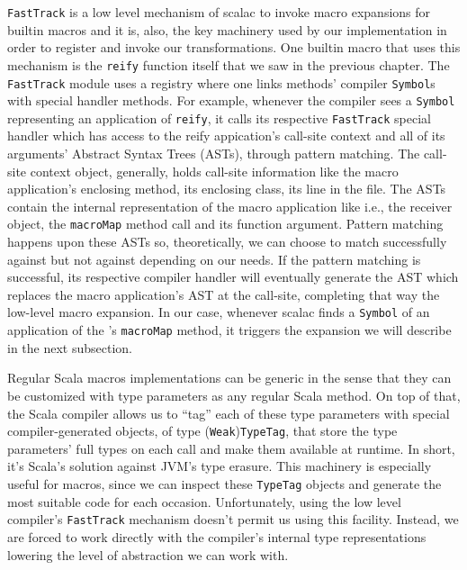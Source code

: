 \texttt{FastTrack} is a low level mechanism of scalac to invoke macro
expansions for builtin macros and it is, also, the key machinery used by our
implementation in order to register and invoke our transformations. One builtin
macro that uses this mechanism is the \texttt{reify} function itself that we saw in the
previous chapter. The \texttt{FastTrack} module uses a registry where one links
methods' compiler \texttt{Symbol}s with special handler methods. For example, whenever
the compiler sees a \texttt{Symbol} representing an application of \texttt{reify}, it calls its
respective \texttt{FastTrack} special handler which has access to the reify appication's
call-site context and all of  its arguments' Abstract Syntax Trees (ASTs),
through pattern matching. The call-site context object, generally, holds
call-site information like the macro application's enclosing method, its
enclosing class, its line in the file. The ASTs contain the internal
representation of the macro application like 
i.e., the receiver object, the \texttt{macroMap} method call and its function argument.
Pattern matching happens upon these ASTs so, theoretically, we can choose to
match successfully against  but not against  depending on our needs. If the pattern
matching is successful, its respective compiler handler will eventually generate
the AST which replaces the macro application's AST at the call-site, completing
that way the low-level macro expansion. In our case, whenever scalac finds a
\texttt{Symbol} of an application of the 's
\texttt{macroMap} method, it triggers the expansion we will describe in the next
subsection.

Regular Scala macros implementations can be generic in the sense that they can
be customized with type parameters as any regular Scala method. On top of that,
the Scala compiler allows us to ``tag'' each of these type parameters with
special compiler-generated objects, of type (\texttt{Weak})\texttt{TypeTag}\cite{oliveira_type_2010}, that store the
type parameters' full types on each call and make them available at runtime. In
short, it's Scala's solution against JVM's type erasure. This machinery is
especially useful for macros, since we can inspect these \texttt{TypeTag} objects and
generate the most suitable code for each occasion. Unfortunately, using the low
level compiler's \texttt{FastTrack} mechanism doesn't permit us using this facility.
Instead, we are forced to work directly with the compiler's internal type
representations lowering the level of abstraction we can work with.

